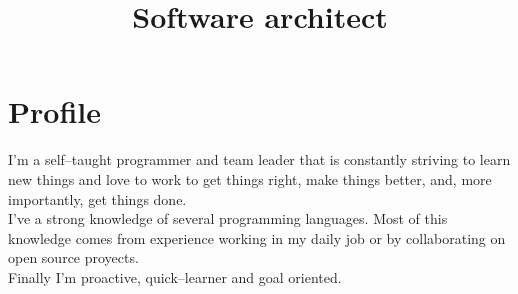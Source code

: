 \documentclass[a4paper,11pt]{moderncv}
\title{Software architect}
\begin{document}
\maketitle

\section{Profile}
I'm a self--taught programmer and team leader that is constantly striving to
learn new things and love to work to get things right, make things better, and,
more importantly, get things done.\\

I've a strong knowledge of several programming languages. Most of this
knowledge comes from experience working in my daily job or by collaborating on
open source proyects.\\

Finally I'm proactive, quick--learner and goal oriented.\\
\end{document}
